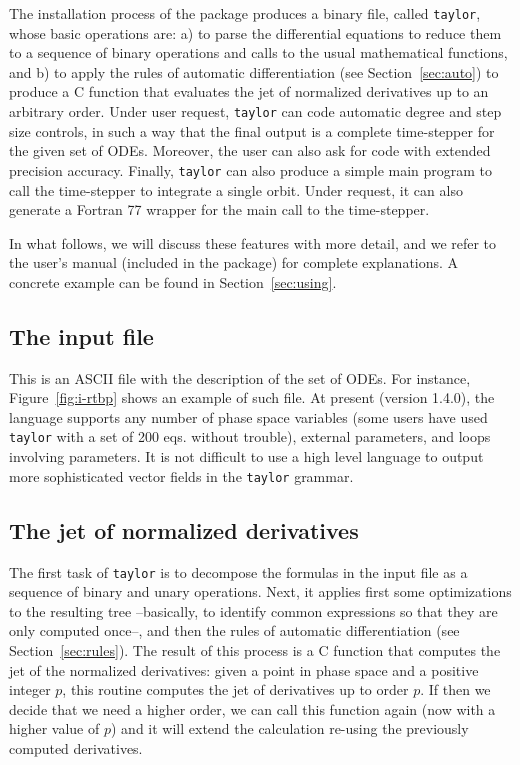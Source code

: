 \documentclass[12pt,twoside]{article}
\begin{document}
The installation process of the package produces a binary file, called
\texttt{taylor}, whose basic operations are: a) to parse the
differential equations to reduce them to a sequence of binary
operations and calls to the usual mathematical functions, and b) to
apply the rules of automatic differentiation (see
Section~\ref{sec:auto}) to produce a C function that evaluates the jet
of normalized derivatives up to an arbitrary order. Under user
request, \texttt{taylor} can code automatic degree and step size
controls, in such a way that the final output is a complete
time-stepper for the given set of ODEs. Moreover, the user can also
ask for code with extended precision accuracy. Finally,
\texttt{taylor} can also produce a simple main program to call the
time-stepper to integrate a single orbit. Under request, it can also
generate a Fortran 77 wrapper for the main call to the time-stepper.

In what follows, we will discuss these features with more detail, and
we refer to the user's manual (included in the package) for complete
explanations. A concrete example can be found in
Section~\ref{sec:using}.

\subsection{The input file}
This is an ASCII file with the description of the set of ODEs. For
instance, Figure~\ref{fig:i-rtbp} shows an example of such file. At
present (version 1.4.0), the language supports any number of phase
space variables (some users have used \texttt{taylor} with a set of
200 eqs. without trouble), external parameters, and loops involving
parameters. It is not difficult to use a high level language to output
more sophisticated vector fields in the \texttt{taylor} grammar.

\subsection{The jet of normalized derivatives}
The first task of \texttt{taylor} is to decompose the formulas in the
input file as a sequence of binary and unary operations. Next, it
applies first some optimizations to the resulting tree --basically, to
identify common expressions so that they are only computed once--, and
then the rules of automatic differentiation (see
Section~\ref{sec:rules}). The result of this process is a C function
that computes the jet of the normalized derivatives: given a point in
phase space and a positive integer $p$, this routine computes the jet
of derivatives up to order $p$. If then we decide that we need a
higher order, we can call this function again (now with a higher value
of $p$) and it will extend the calculation re-using the previously
computed derivatives.
\end{document}
